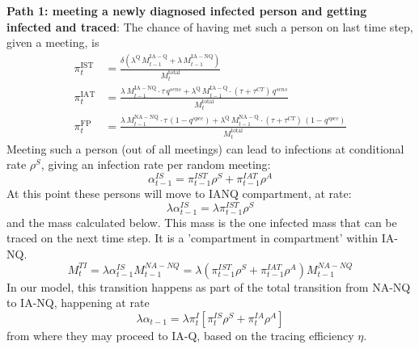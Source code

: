 \documentclass{article}
\begin{document}
\textbf{Path 1: meeting a newly diagnosed infected person and getting infected and traced}: The chance of having met such a person on last time step, given a meeting, is
\begin{align}
	\pi_t^\mathrm{IST} &= \frac{\delta (\lambda^\mathrm{Q} \, M^\mathrm{IA-Q}_{t-1} + \lambda \, M^\mathrm{IA-NQ}_{t-1})}{ M_t^\mathrm{total}}\nonumber  \\
	\pi_t^\mathrm{IAT} &= \frac{\lambda \, M_{t-1}^\mathrm{IA-NQ}\cdot \tau \,q^{sens} + \lambda^\mathrm{Q} \, M_{t-1}^\mathrm{IA-Q}\cdot (\tau + \tau^{CT}) \,q^{sens}}{M_t^\mathrm{total}} \nonumber \\
	\pi_t^\mathrm{FP} &= \frac{\lambda \, M_{t-1}^\mathrm{NA-NQ}\cdot \tau \,(1-q^{spec}) + \lambda^\mathrm{Q} \, M_{t-1}^\mathrm{NA-Q}\cdot (\tau + \tau^{CT}) \,(1- q^{spec})}{M_t^\mathrm{total}} 
\end{align}
Meeting such a person (out of all meetings) can lead to infections  at conditional rate $\rho^S$, giving an infection rate per random meeting:
\begin{equation}
  \alpha^{IS}_{t-1} = \pi^{IST}_{t-1}\rho^S + \pi^{IAT}_{t-1}\rho^A
\end{equation}
At this point these persons will move to IANQ compartment, at rate: 
\begin{equation}
	\lambda\alpha^{IS}_{t-1} = \lambda \pi^{IST}_{t-1}\rho^S
\end{equation} and the mass calculated below. This mass is the one infected mass that can be traced on the next time step. It is a 'compartment in compartment' within IA-NQ.
\begin{equation}
	M_t^{TI} = \lambda\alpha^{IS}_{t-1} M_{t-1}^{NA-NQ} = \lambda (\pi^{IST}_{t-1}\rho^S + \pi^{IAT}_{t-1}\rho^A)M_{t-1}^{NA-NQ}
\end{equation}
In our model, this transition happens as part of the total transition from NA-NQ to IA-NQ, happening at rate
\begin{equation}
	\lambda \alpha_{t-1} = \lambda \pi_t^I[\pi_t^{IS} \rho^S + \pi_t^{IA} \rho^A]
\end{equation}
from where they may proceed to IA-Q, based on the tracing efficiency $\eta$. 
\end{document}
